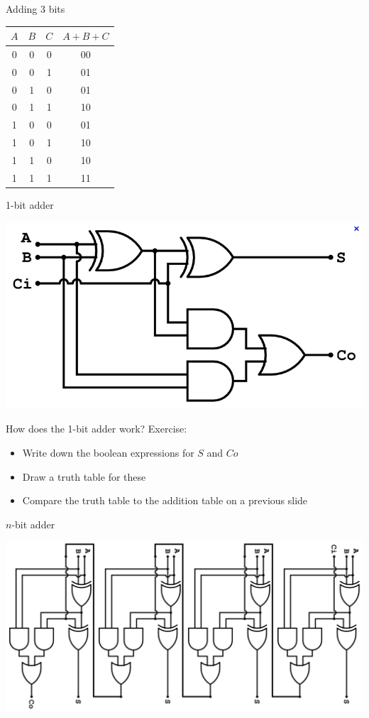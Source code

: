 \begin{frame}{Adding 3 bits}
    \begin{center}
        \begin{tabular}{|ccc|c|}
            \hline
            $A$ & $B$ & $C$ & $A+B+C$ \\\hline
            0 & 0 & 0 & 00 \\
            0 & 0 & 1 & 01 \\
            0 & 1 & 0 & 01 \\
            0 & 1 & 1 & 10 \\
            1 & 0 & 0 & 01 \\
            1 & 0 & 1 & 10 \\
            1 & 1 & 0 & 10 \\
            1 & 1 & 1 & 11 \\\hline
        \end{tabular}
    \end{center}
\end{frame}

\begin{frame}{1-bit adder}
	\begin{center}
		\includegraphics[width=\textwidth]{1bit_adder}
	\end{center}
\end{frame}

\begin{frame}{How does the 1-bit adder work?}
    Exercise:
	\begin{itemize}
		\item Write down the boolean expressions for $S$ and $Co$
		\item Draw a truth table for these
		\item Compare the truth table to the addition table on a previous slide
	\end{itemize}
\end{frame}

\begin{frame}{$n$-bit adder}
	\begin{center}
		\includegraphics[width=\textwidth]{nbit_adder}
	\end{center}
\end{frame}

